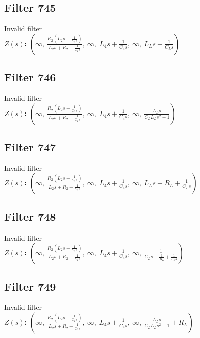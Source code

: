 \documentclass{article}
\begin{document}
\subsection*{Filter 745}
Invalid filter \\ 
\textbf{$Z(s)$:} $\left( \infty, \  \frac{R_{2} \left(L_{2} s + \frac{1}{C_{2} s}\right)}{L_{2} s + R_{2} + \frac{1}{C_{2} s}}, \  \infty, \  L_{4} s + \frac{1}{C_{4} s}, \  \infty, \  L_{L} s + \frac{1}{C_{L} s}\right)$ \\ 
\subsection*{Filter 746}
Invalid filter \\ 
\textbf{$Z(s)$:} $\left( \infty, \  \frac{R_{2} \left(L_{2} s + \frac{1}{C_{2} s}\right)}{L_{2} s + R_{2} + \frac{1}{C_{2} s}}, \  \infty, \  L_{4} s + \frac{1}{C_{4} s}, \  \infty, \  \frac{L_{L} s}{C_{L} L_{L} s^{2} + 1}\right)$ \\ 
\subsection*{Filter 747}
Invalid filter \\ 
\textbf{$Z(s)$:} $\left( \infty, \  \frac{R_{2} \left(L_{2} s + \frac{1}{C_{2} s}\right)}{L_{2} s + R_{2} + \frac{1}{C_{2} s}}, \  \infty, \  L_{4} s + \frac{1}{C_{4} s}, \  \infty, \  L_{L} s + R_{L} + \frac{1}{C_{L} s}\right)$ \\ 
\subsection*{Filter 748}
Invalid filter \\ 
\textbf{$Z(s)$:} $\left( \infty, \  \frac{R_{2} \left(L_{2} s + \frac{1}{C_{2} s}\right)}{L_{2} s + R_{2} + \frac{1}{C_{2} s}}, \  \infty, \  L_{4} s + \frac{1}{C_{4} s}, \  \infty, \  \frac{1}{C_{L} s + \frac{1}{R_{L}} + \frac{1}{L_{L} s}}\right)$ \\ 
\subsection*{Filter 749}
Invalid filter \\ 
\textbf{$Z(s)$:} $\left( \infty, \  \frac{R_{2} \left(L_{2} s + \frac{1}{C_{2} s}\right)}{L_{2} s + R_{2} + \frac{1}{C_{2} s}}, \  \infty, \  L_{4} s + \frac{1}{C_{4} s}, \  \infty, \  \frac{L_{L} s}{C_{L} L_{L} s^{2} + 1} + R_{L}\right)$ \\ 
\end{document}
